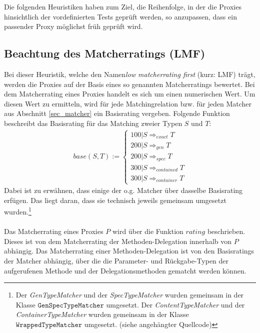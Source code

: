 Die folgenden Heuristiken haben zum Ziel, die Reihenfolge, in der die Proxies hinsichtlich der vordefinierten Tests geprüft werden, so anzupassen, dass ein passender Proxy möglichst früh geprüft wird.


\subsection{Beachtung des Matcherratings (LMF)}\label{sec_lmf}
Bei dieser Heuristik, welche den Namen\emph{low matcherrating first} (kurz: LMF) trägt, werden die Proxies auf der Basis eines so genannten Matcherratings bewertet. Bei dem Matcherrating eines Proxies handelt es sich um einen numerischen Wert. Um diesen Wert zu ermitteln, wird für jede Matchingrelation bzw. für jeden Matcher aus Abschnitt \ref{sec_matcher} ein Basisrating vergeben. Folgende Funktion beschreibt das Basisrating für das Matching zweier Typen $S$ und $T$:
\begin{gather*}
\mathit{base(S,T)} :=  \left\{ 
				\begin{array}{l}
					100 | S \Rightarrow_{exact}  T  \\
					200 | S \Rightarrow_{gen}  T  \\
					200 | S \Rightarrow_{spec}  T  \\
					300 | S \Rightarrow_{contained}  T   \\
					300 | S \Rightarrow_{container}  T  				
				\end{array}             
	\right.
\end{gather*}
\noindent
Dabei ist zu erwähnen, dass einige der o.g. Matcher über dasselbe Basisrating erfügen. Das liegt daran, dass sie technisch jeweils gemeinsam umgesetzt wurden.\footnote{Der \emph{GenTypeMatcher} und der \emph{SpecTypeMatcher} wurden gemeinsam in der Klasse $\texttt{GenSpecTypeMatcher}$ umgesetzt. Der \emph{ContentTypeMatcher} und der \emph{ContainerTypeMatcher} wurden gemeinsam in der Klasse $\texttt{WrappedTypeMatcher}$ umgesetzt. (siehe angehängter Quellcode)}
\\\\
Das Matcherrating eines Proxies $P$ wird über die Funktion $\mathit{rating}$ beschrieben. Dieses ist von dem Matcherrating der Methoden-Delegation innerhalb von $P$ abhängig. Das Matcherrating einer Methoden-Delegation ist von den Basisratings der Matcher abhängig, über die die Parameter- und Rückgabe-Typen der aufgerufenen Methode und der Delegationsmethoden gematcht werden können. 
